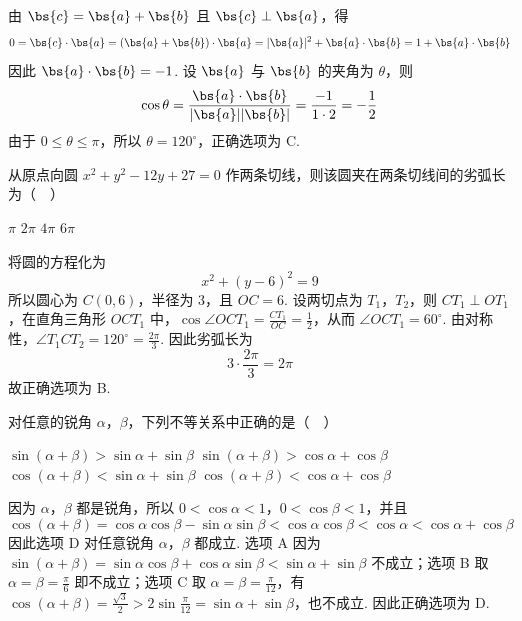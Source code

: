 \begin{solution}
由 \(\bs{c}=\bs{a}+\bs{b}\) 且 \(\bs{c}\perp\bs{a}\)，得
\[
0=\bs{c}\cdot\bs{a}=(\bs{a}+\bs{b})\cdot\bs{a}=|\bs{a}|^2+\bs{a}\cdot\bs{b}=1+\bs{a}\cdot\bs{b}
\]
因此 \(\bs{a}\cdot\bs{b}=-1\). 设 \(\bs{a}\) 与 \(\bs{b}\) 的夹角为 \(\theta\)，则
\[
\cos\theta=\frac{\bs{a}\cdot\bs{b}}{|\bs{a}||\bs{b}|}=\frac{-1}{1\cdot2}=-\frac12
\]
由于 \(0\leqslant\theta\leqslant\pi\)，所以 \(\theta=120^\circ\)，正确选项为 C.
\end{solution}

\begin{problem}
从原点向圆 \(x^2+y^2-12y+27=0\) 作两条切线，则该圆夹在两条切线间的劣弧长为（\(\quad\)）

\choices
    {\(\pi\)}
    {\(2\pi\)}
    {\(4\pi\)}
    {\(6\pi\)}
\end{problem}

\begin{solution}
将圆的方程化为
\[
x^2+(y-6)^2=9
\]
所以圆心为 \(C(0,6)\)，半径为 \(3\)，且 \(OC=6\). 设两切点为 \(T_1\)，\(T_2\)，则 \(CT_1\perp OT_1\)，在直角三角形 \(OCT_1\) 中，\(\cos\angle OCT_1=\frac{CT_1}{OC}=\frac12\)，从而 \(\angle OCT_1=60^\circ\). 由对称性，\(\angle T_1CT_2=120^\circ=\frac{2\pi}{3}\). 因此劣弧长为
\[
3\cdot\frac{2\pi}{3}=2\pi
\]
故正确选项为 B.
\end{solution}

\begin{problem}
对任意的锐角 \(\alpha\)，\(\beta\)，下列不等关系中正确的是（\(\quad\)）

\choices
    {\(\sin(\alpha+\beta)>\sin\alpha+\sin\beta\)}
    {\(\sin(\alpha+\beta)>\cos\alpha+\cos\beta\)}
    {\(\cos(\alpha+\beta)<\sin\alpha+\sin\beta\)}
    {\(\cos(\alpha+\beta)<\cos\alpha+\cos\beta\)}
\end{problem}

\begin{solution}
因为 \(\alpha\)，\(\beta\) 都是锐角，所以 \(0<\cos\alpha<1\)，\(0<\cos\beta<1\)，并且
\[
\cos(\alpha+\beta)=\cos\alpha\cos\beta-\sin\alpha\sin\beta<\cos\alpha\cos\beta<\cos\alpha<\cos\alpha+\cos\beta
\]
因此选项 D 对任意锐角 \(\alpha\)，\(\beta\) 都成立. 选项 A 因为 \(\sin(\alpha+\beta)=\sin\alpha\cos\beta+\cos\alpha\sin\beta<\sin\alpha+\sin\beta\) 不成立；选项 B 取 \(\alpha=\beta=\frac{\pi}{6}\) 即不成立；选项 C 取 \(\alpha=\beta=\frac{\pi}{12}\)，有 \(\cos(\alpha+\beta)=\frac{\sqrt3}{2}>2\sin\frac{\pi}{12}=\sin\alpha+\sin\beta\)，也不成立. 因此正确选项为 D.
\end{solution}

